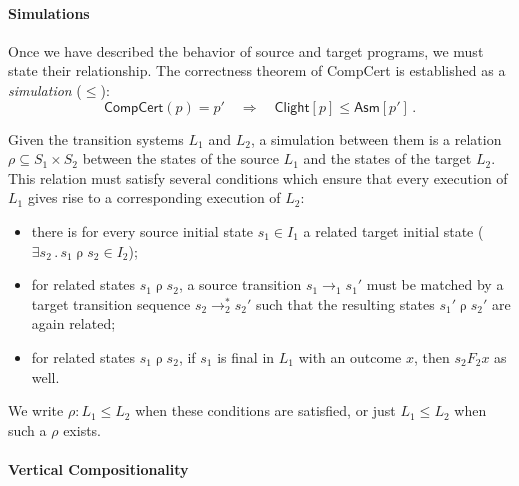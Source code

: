 \documentclass[acmsmall,screen,review,anonymous]{acmart}
\newcommand{\kw}[1]{\ensuremath{ \mathsf{#1} }}
\begin{document}


\paragraph{Simulations} %

Once we have described
the behavior of source and target programs,
we must state their relationship.
The correctness theorem of CompCert is established as a \emph{simulation} ($\le$):
\begin{equation}
    \kw{CompCert}(p) = p'
    \quad\Longrightarrow\quad
    \kw{Clight}[p] \le \kw{Asm}[p']
    \,.
    \label{eqn:ccc-wp}
\end{equation}

Given the transition systems $L_1$ and $L_2$,
a simulation between them is a relation $\rho \subseteq S_1 \times S_2$
between the states of the source $L_1$
and the states of the target $L_2$.
This relation must satisfy several conditions
which ensure that
every execution of $L_1$ gives rise
to a corresponding execution of $L_2$:
\begin{itemize}
  \item there is for every source initial state $s_1 \in I_1$
    a related target initial state
    ($\exists s_2 \mathbin. s_1 \mathrel\rho s_2 \in I_2$);
  \item for related states $s_1 \mathrel\rho s_2$,
    a source transition $s_1 \rightarrow_1 s_1'$ must be matched by
    a target transition sequence $s_2 \rightarrow_2^* s_2'$ such that
    the resulting states $s_1' \mathrel\rho s_2'$ are again related;
  \item for related states $s_1 \mathrel\rho s_2$,
    if $s_1$ is final in $L_1$ with an outcome $x$,
    then $s_2 \mathrel{F_2} x$ as well.
\end{itemize}
We write $\rho : L_1 \le L_2$ when these conditions are satisfied,
or just $L_1 \le L_2$ when such a $\rho$ exists.


\paragraph{Vertical Compositionality} %
\end{document}
